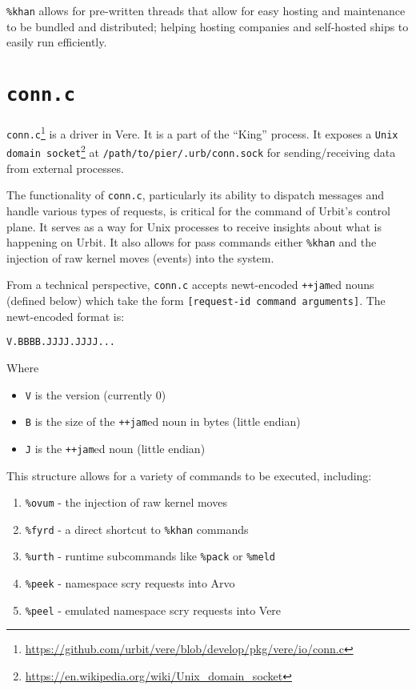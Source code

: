 \documentclass[twoside]{article}
\begin{document}
\texttt{\%khan} allows for pre-written threads that allow for easy hosting and maintenance to be bundled and distributed; helping hosting companies and self-hosted ships to easily run efficiently. 


\section{\texttt{conn.c}} 

\texttt{conn.c}\footnote{\url{https://github.com/urbit/vere/blob/develop/pkg/vere/io/conn.c}} is a driver in Vere. 
It is a part of the ``King'' process. 
It exposes a \texttt{Unix domain socket}\footnote{\url{https://en.wikipedia.org/wiki/Unix_domain_socket}} at \texttt{/path/to/pier/.urb/conn.sock} for sending/receiving data from external processes.

The functionality of \texttt{conn.c}, particularly its ability to dispatch messages and handle various types of requests, is critical for the command of Urbit's control plane.
It serves as a way for Unix processes to receive insights about what is happening on Urbit. 
It also allows for pass commands either \texttt{\%khan} and the injection of raw kernel moves (events) into the system. 

From a technical perspective, \texttt{conn.c} accepts newt-encoded \texttt{++jam}ed nouns (defined below) which take the form \texttt{[request-id command arguments]}. 
The newt-encoded format is:

\begin{verbatim}
V.BBBB.JJJJ.JJJJ...
\end{verbatim}

Where 
\begin{itemize}
  \item \texttt{V} is the version (currently 0)
  \item \texttt{B} is the size of the \texttt{++jam}ed noun in bytes (little endian)
  \item \texttt{J} is the \texttt{++jam}ed noun (little endian)
\end{itemize}

This structure allows for a variety of commands to be executed, including:

\begin{enumerate}
  \item \texttt{\%ovum} - the injection of raw kernel moves 
  \item \texttt{\%fyrd} - a direct shortcut to \texttt{\%khan} commands
  \item \texttt{\%urth} - runtime subcommands like \texttt{\%pack} or \texttt{\%meld}
  \item \texttt{\%peek} - namespace scry requests into Arvo
  \item \texttt{\%peel} - emulated namespace scry requests into Vere
\end{enumerate}
\end{document}
